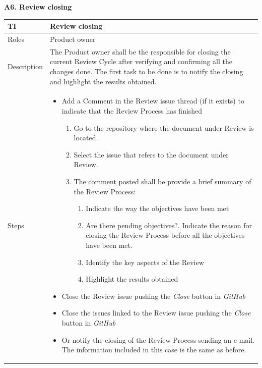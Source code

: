 \documentclass{template/openetcs_article}
\begin{document}
\textbf{A6. Review closing}

\begin{flushleft}
\tablefirsthead{}
\tablehead{}
\tabletail{}
\tablelasttail{}
\begin{supertabular}{|m{2cm}|m{13cm}|}
\hline
{}
TI & 
Review closing
\\\hline
Roles &
Product owner
\\\hline
Description &
The Product owner shall be the responsible for closing the current Review Cycle after verifying and confirming all the changes done. The first task to be done is to notify the closing and highlight the results obtained.
\\\hline
Steps &
\begin{itemize}
\item Add a Comment in the Review issue thread (if it exists) to indicate that the Review Process has finished
\begin{enumerate}
\item Go to the repository where the document under Review is located.
\item Select the issue that refers to the document under Review.
\item The comment posted shall be provide a brief summary of the Review Process:
\begin{enumerate}
\item Indicate the way the objectives have been met 
\item Are there pending objectives?. Indicate the reason for closing the Review Process before all the objectives have been met.
\item Identify the key aspects of the Review
\item Highlight the results obtained
\end{enumerate}
\end{enumerate}
\item Close the Review issue pushing the {\it Close} button in {\it GitHub}
\item Close the issues linked to the Review issue pushing the {\it Close} button in {\it GitHub}
\item Or notify the closing of the Review Process sending an e-mail. The information included in this case is the same as before.
\end{itemize}
\\\hline
\end{supertabular}
\end{flushleft}
\end{document}
